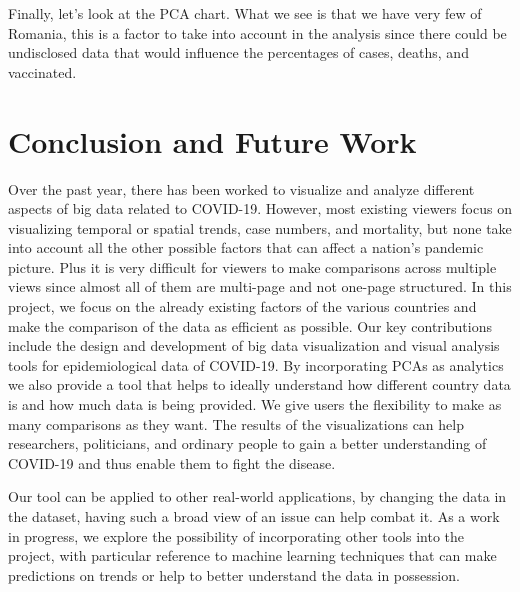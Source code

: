 \documentclass[10pt,conference]{IEEEtran}
\begin{document}
Finally, let's look at the PCA chart. What we see is that we have very few of Romania, this is a factor to take into account in the analysis since there could be undisclosed data that would influence the percentages of cases, deaths, and vaccinated.



\section{Conclusion and Future Work}
Over the past year, there has been worked to visualize and analyze different aspects of big data related to COVID-19. However, most existing viewers focus on visualizing temporal or spatial trends, case numbers, and mortality, but none take into account all the other possible factors that can affect a nation's pandemic picture. Plus it is very difficult for viewers to make comparisons across multiple views since almost all of them are multi-page and not one-page structured. In this project, we focus on the already existing factors of the various countries and make the comparison of the data as efficient as possible. Our key contributions include the design and development of big data visualization and visual analysis tools for epidemiological data of COVID-19. By incorporating PCAs as analytics we also provide a tool that helps to ideally understand how different country data is and how much data is being provided. We give users the flexibility to make as many comparisons as they want. The results of the visualizations can help researchers, politicians, and ordinary people to gain a better understanding of COVID-19 and thus enable them to fight the disease.

Our tool can be applied to other real-world applications, by changing the data in the dataset, having such a broad view of an issue can help combat it. As a work in progress, we explore the possibility of incorporating other tools into the project, with particular reference to machine learning techniques that can make predictions on trends or help to better understand the data in possession.
\end{document}
